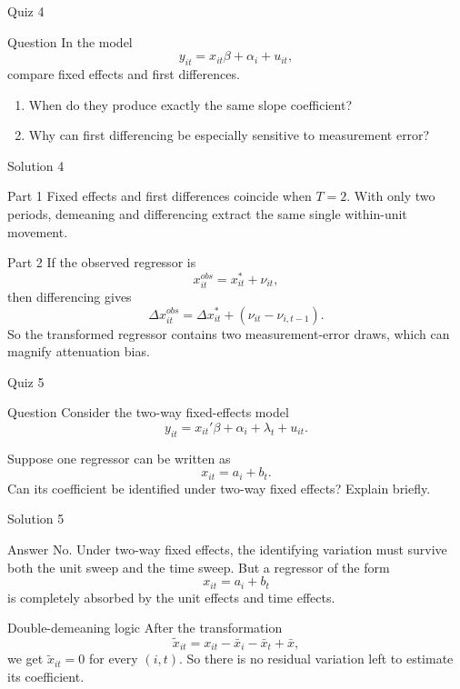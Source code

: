 \documentclass[10pt]{beamer}
\begin{document}
\begin{frame}{Quiz 4}
\small
\begin{block}{Question}
In the model
\[
y_{it}=x_{it}\beta+\alpha_i+u_{it},
\]
compare fixed effects and first differences.

\begin{enumerate}
  \item When do they produce exactly the same slope coefficient?
  \item Why can first differencing be especially sensitive to measurement error?
\end{enumerate}
\end{block}
\end{frame}

\begin{frame}{Solution 4}
\small
\begin{exampleblock}{Part 1}
Fixed effects and first differences coincide when $T=2$. With only two periods, demeaning and differencing extract the same single within-unit movement.
\end{exampleblock}

\begin{exampleblock}{Part 2}
If the observed regressor is
\[
x_{it}^{obs}=x_{it}^\ast+\nu_{it},
\]
then differencing gives
\[
\Delta x_{it}^{obs}=\Delta x_{it}^\ast+(\nu_{it}-\nu_{i,t-1}).
\]
So the transformed regressor contains two measurement-error draws, which can magnify attenuation bias.
\end{exampleblock}
\end{frame}

\begin{frame}{Quiz 5}
\small
\begin{block}{Question}
Consider the two-way fixed-effects model
\[
y_{it}=x_{it}'\beta+\alpha_i+\lambda_t+u_{it}.
\]

Suppose one regressor can be written as
\[
x_{it}=a_i+b_t.
\]
Can its coefficient be identified under two-way fixed effects? Explain briefly.
\end{block}
\end{frame}

\begin{frame}{Solution 5}
\small
\begin{exampleblock}{Answer}
No. Under two-way fixed effects, the identifying variation must survive both the unit sweep and the time sweep. But a regressor of the form
\[
x_{it}=a_i+b_t
\]
is completely absorbed by the unit effects and time effects.
\end{exampleblock}

\begin{block}{Double-demeaning logic}
After the transformation
\[
\tilde x_{it}=x_{it}-\bar x_i-\bar x_t+\bar x,
\]
we get $\tilde x_{it}=0$ for every $(i,t)$. So there is no residual variation left to estimate its coefficient.
\end{block}
\end{frame}
\end{document}
